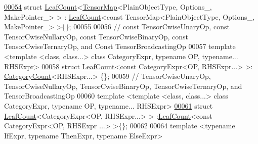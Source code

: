 \begin{DoxyCode}
\hyperlink{struct_eigen_1_1_tensor_sycl_1_1internal_1_1_leaf_count_3_01_tensor_map_3_01_plain_object_type_0624646cd155dec3a2f37d211ae188af3}{00054} \textcolor{keyword}{struct }\hyperlink{struct_eigen_1_1_tensor_sycl_1_1internal_1_1_leaf_count}{LeafCount}<\hyperlink{class_eigen_1_1_tensor_map}{TensorMap}<PlainObjectType, Options\_, MakePointer\_> > :
      \hyperlink{struct_eigen_1_1_tensor_sycl_1_1internal_1_1_leaf_count}{LeafCount}<const TensorMap<PlainObjectType, Options\_, MakePointer\_> >\{\};
00055 
00056 \textcolor{comment}{// const TensorCwiseUnaryOp, const TensorCwiseNullaryOp, const TensorCwiseBinaryOp, const
       TensorCwiseTernaryOp, and Const TensorBroadcastingOp}
00057 \textcolor{keyword}{template} <\textcolor{keyword}{template} <\textcolor{keyword}{class}, \textcolor{keyword}{class}...> \textcolor{keyword}{class }CategoryExpr, \textcolor{keyword}{typename} OP, \textcolor{keyword}{typename}... RHSExpr>
\hyperlink{struct_eigen_1_1_tensor_sycl_1_1internal_1_1_leaf_count_3_01const_01_category_expr_3_01_o_p_00_01_r_h_s_expr_8_8_8_01_4_01_4}{00058} \textcolor{keyword}{struct }\hyperlink{struct_eigen_1_1_tensor_sycl_1_1internal_1_1_leaf_count}{LeafCount}<const CategoryExpr<OP, RHSExpr...> >: \hyperlink{struct_eigen_1_1_tensor_sycl_1_1internal_1_1_category_count}{CategoryCount}<RHSExpr...> \{\};
00059 \textcolor{comment}{// TensorCwiseUnaryOp,  TensorCwiseNullaryOp,  TensorCwiseBinaryOp,  TensorCwiseTernaryOp, and 
       TensorBroadcastingOp}
00060 \textcolor{keyword}{template} <\textcolor{keyword}{template} <\textcolor{keyword}{class}, \textcolor{keyword}{class}...> \textcolor{keyword}{class }CategoryExpr, \textcolor{keyword}{typename} OP, \textcolor{keyword}{typename}... RHSExpr>
\hyperlink{struct_eigen_1_1_tensor_sycl_1_1internal_1_1_leaf_count_3_01_category_expr_3_01_o_p_00_01_r_h_s_expr_8_8_8_01_4_01_4}{00061} \textcolor{keyword}{struct }\hyperlink{struct_eigen_1_1_tensor_sycl_1_1internal_1_1_leaf_count}{LeafCount}<CategoryExpr<OP, RHSExpr...> > :\hyperlink{struct_eigen_1_1_tensor_sycl_1_1internal_1_1_leaf_count}{LeafCount}<const CategoryExpr<OP, RHSExpr
      ...> >\{\};
00062 
00064 \textcolor{keyword}{template} <\textcolor{keyword}{typename} IfExpr, \textcolor{keyword}{typename} ThenExpr, \textcolor{keyword}{typename} ElseExpr>

\end{DoxyCode}
